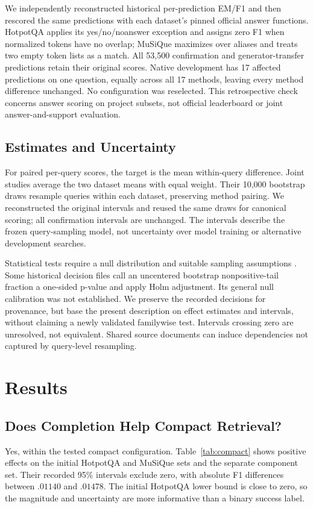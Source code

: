\documentclass[11pt]{article}
\begin{document}
We independently reconstructed historical per-prediction EM/F1 and then
rescored the same predictions with each dataset's pinned official answer
functions. HotpotQA applies its yes/no/noanswer exception and assigns zero
F1 when normalized tokens have no overlap; MuSiQue maximizes over aliases
and treats two empty token lists as a match. All 53,500 confirmation and
generator-transfer predictions retain their original scores. Native
development has 17 affected predictions on one question, equally across all
17 methods, leaving every method difference unchanged. No configuration was
reselected. This retrospective check concerns answer scoring on project
subsets, not official leaderboard or joint answer-and-support evaluation.

\subsection{Estimates and Uncertainty}
For paired per-query scores, the target is the mean within-query difference.
Joint studies average the two dataset means with equal weight. Their 10,000
bootstrap draws resample queries within each dataset, preserving method
pairing. We reconstructed the original intervals and reused the same draws
for canonical scoring; all confirmation intervals are unchanged.
The intervals describe the frozen query-sampling model,
not uncertainty over model training or alternative development searches.

Statistical tests require a null distribution and suitable sampling assumptions
\citep{dror2018hitchhiker}. Some historical decision files call an uncentered
bootstrap nonpositive-tail fraction a one-sided p-value and apply Holm
adjustment. Its general null calibration was not established. We preserve the
recorded decisions for provenance, but base the present description on effect
estimates and intervals, without claiming a newly validated familywise test.
Intervals crossing zero are unresolved, not equivalent. Shared source
documents can induce dependencies not captured by query-level resampling.

\section{Results}
\subsection{Does Completion Help Compact Retrieval?}
Yes, within the tested compact configuration. Table~\ref{tab:compact} shows
positive effects on the initial HotpotQA and MuSiQue sets and the separate
component set. Their recorded 95\% intervals exclude zero, with absolute
F1 differences between $.01140$ and $.01478$. The initial HotpotQA lower
bound is close to zero, so the magnitude and uncertainty are more informative
than a binary success label.
\end{document}
